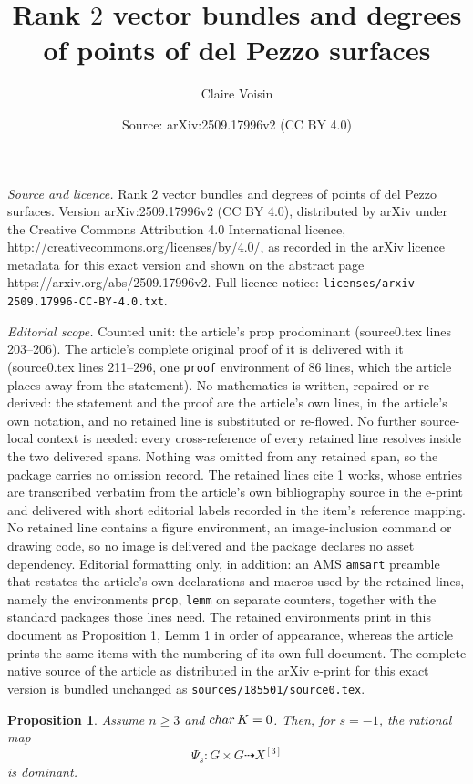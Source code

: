 \documentclass[10pt,a4paper]{amsart}
\title{Rank $2$ vector bundles and degrees of points of del Pezzo surfaces}
\author{Claire Voisin}
\date{Source: arXiv:2509.17996v2 (CC BY 4.0)}
\newtheorem{prop}{Proposition}
\begin{document}
\maketitle

\noindent\emph{Source and licence.} Rank $2$ vector bundles and degrees of points of del Pezzo surfaces. Version arXiv:2509.17996v2 (CC BY 4.0), distributed by arXiv under the Creative Commons Attribution 4.0 International licence, http://creativecommons.org/licenses/by/4.0/, as recorded in the arXiv licence metadata for this exact version and shown on the abstract page https://arxiv.org/abs/2509.17996v2. Full licence notice: \texttt{licenses/arxiv-2509.17996-CC-BY-4.0.txt}.\par\smallskip

\noindent\textit{Editorial scope.} Counted unit: the article's prop prodominant (source0.tex lines 203--206). The article's complete original proof of it is delivered with it (source0.tex lines 211--296, one \texttt{proof} environment of 86 lines, which the article places away from the statement). No mathematics is written, repaired or re-derived: the statement and the proof are the article's own lines, in the article's own notation, and no retained line is substituted or re-flowed.  No further source-local context is needed: every cross-reference of every retained line resolves inside the two delivered spans.  Nothing was omitted from any retained span, so the package carries no omission record.  The retained lines cite 1 works, whose entries are transcribed verbatim from the article's own bibliography source in the e-print and delivered with short editorial labels recorded in the item's reference mapping.  No retained line contains a figure environment, an image-inclusion command or drawing code, so no image is delivered and the package declares no asset dependency.  Editorial formatting only, in addition: an AMS \texttt{amsart} preamble that restates the article's own declarations and macros used by the retained lines, namely the environments \texttt{prop}, \texttt{lemm} on separate counters, together with the standard packages those lines need.  The retained environments print in this document as Proposition 1, Lemm 1 in order of appearance, whereas the article prints the same items with the numbering of its own full document.  The complete native source of the article as distributed in the arXiv e-print for this exact version is bundled unchanged as \texttt{sources/185501/source0.tex}.
\begin{prop}\label{prodominant}  Assume $n\geq 3$ and ${\rm char}\,K=0$. Then, for  $s=-1$, the rational map
$$\Psi_s: G\times G\dashrightarrow X^{[3]}$$
is dominant.
\end{prop}
\end{document}
